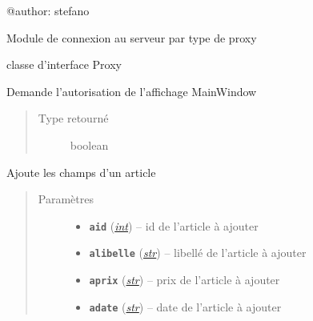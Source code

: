 \documentclass[letterpaper,10pt,french]{sphinxmanual}
\begin{document}
@author: stefano

Module de connexion au serveur par type de proxy

\begin{fulllineitems}
\label{proxy:proxy.Proxy}
classe d'interface Proxy

\begin{fulllineitems}
\label{proxy:proxy.Proxy.afficherMainWindow}
Demande l'autorisation de l'affichage MainWindow
\begin{quote}\begin{description}
\item[{Type retourné}] \leavevmode
boolean

\end{description}\end{quote}

\end{fulllineitems}


\begin{fulllineitems}
\label{proxy:proxy.Proxy.ajouterArticle}
Ajoute les champs d'un article
\begin{quote}\begin{description}
\item[{Paramètres}] \leavevmode\begin{itemize}
\item {} 
\textbf{\texttt{aid}} (\href{https://docs.python.org/library/functions.html\#int}{\emph{int}}) -- id de l'article à ajouter

\item {} 
\textbf{\texttt{alibelle}} (\href{https://docs.python.org/library/functions.html\#str}{\emph{str}}) -- libellé de l'article à ajouter

\item {} 
\textbf{\texttt{aprix}} (\href{https://docs.python.org/library/functions.html\#str}{\emph{str}}) -- prix de l'article à ajouter

\item {} 
\textbf{\texttt{adate}} (\href{https://docs.python.org/library/functions.html\#str}{\emph{str}}) -- date de l'article à ajouter


\end{itemize}
\end{description}
\end{quote}
\end{fulllineitems}
\end{fulllineitems}
\end{document}
